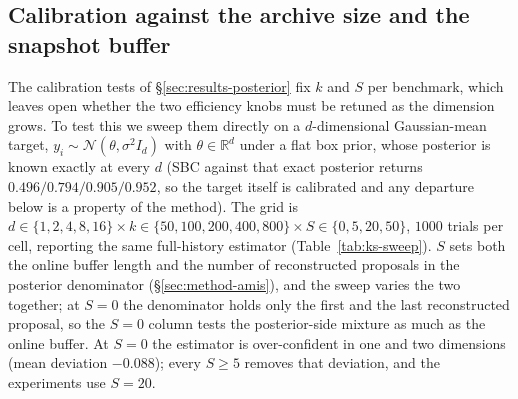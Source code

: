 \documentclass[10pt]{article}
\theoremstyle{plain}
\theoremstyle{definition}
\begin{document}
\subsection{Calibration against the archive size and the snapshot buffer}
The calibration tests of \S\ref{sec:results-posterior} fix $k$ and $S$ per benchmark, which leaves open whether the two efficiency knobs must be retuned as the dimension grows. To test this we sweep them directly on a $d$-dimensional Gaussian-mean target, $y_i\sim\mathcal N(\theta,\sigma^2 I_d)$ with $\theta\in\mathbb R^d$ under a flat box prior, whose posterior is known exactly at every $d$ (SBC against that exact posterior returns $0.496/0.794/0.905/0.952$, so the target itself is calibrated and any departure below is a property of the method). The grid is $d\in\{1,2,4,8,16\}\times k\in\{50,100,200,400,800\}\times S\in\{0,5,20,50\}$, $1000$ trials per cell, reporting the same full-history estimator (Table~\ref{tab:ks-sweep}). $S$ sets both the online buffer length and the number of reconstructed proposals in the posterior denominator (\S\ref{sec:method-amis}), and the sweep varies the two together; at $S=0$ the denominator holds only the first and the last reconstructed proposal, so the $S=0$ column tests the posterior-side mixture as much as the online buffer. At $S=0$ the estimator is over-confident in one and two dimensions (mean deviation $-0.088$); every $S\ge5$ removes that deviation, and the experiments use $S=20$.
\end{document}
